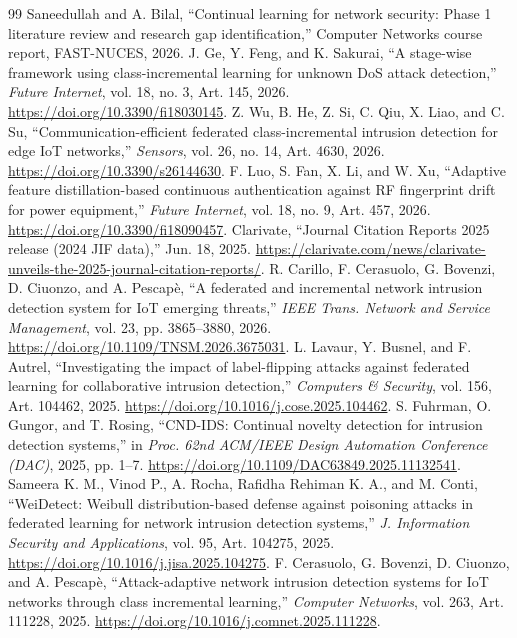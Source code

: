 \documentclass[10pt,a4paper]{article}
\begin{document}
\begin{thebibliography}{99}
 Saneedullah and A. Bilal, \enquote{Continual learning for network security: Phase 1 literature review and research gap identification,} Computer Networks course report, FAST-NUCES, 2026.
 J. Ge, Y. Feng, and K. Sakurai, \enquote{A stage-wise framework using class-incremental learning for unknown DoS attack detection,} \emph{Future Internet}, vol. 18, no. 3, Art. 145, 2026. \url{https://doi.org/10.3390/fi18030145}.
 Z. Wu, B. He, Z. Si, C. Qiu, X. Liao, and C. Su, \enquote{Communication-efficient federated class-incremental intrusion detection for edge IoT networks,} \emph{Sensors}, vol. 26, no. 14, Art. 4630, 2026. \url{https://doi.org/10.3390/s26144630}.
 F. Luo, S. Fan, X. Li, and W. Xu, \enquote{Adaptive feature distillation-based continuous authentication against RF fingerprint drift for power equipment,} \emph{Future Internet}, vol. 18, no. 9, Art. 457, 2026. \url{https://doi.org/10.3390/fi18090457}.
 Clarivate, \enquote{Journal Citation Reports 2025 release (2024 JIF data),} Jun. 18, 2025. \url{https://clarivate.com/news/clarivate-unveils-the-2025-journal-citation-reports/}.
 R. Carillo, F. Cerasuolo, G. Bovenzi, D. Ciuonzo, and A. Pescapè, \enquote{A federated and incremental network intrusion detection system for IoT emerging threats,} \emph{IEEE Trans. Network and Service Management}, vol. 23, pp. 3865--3880, 2026. \url{https://doi.org/10.1109/TNSM.2026.3675031}.
 L. Lavaur, Y. Busnel, and F. Autrel, \enquote{Investigating the impact of label-flipping attacks against federated learning for collaborative intrusion detection,} \emph{Computers \& Security}, vol. 156, Art. 104462, 2025. \url{https://doi.org/10.1016/j.cose.2025.104462}.
 S. Fuhrman, O. Gungor, and T. Rosing, \enquote{CND-IDS: Continual novelty detection for intrusion detection systems,} in \emph{Proc. 62nd ACM/IEEE Design Automation Conference (DAC)}, 2025, pp. 1--7. \url{https://doi.org/10.1109/DAC63849.2025.11132541}.
 Sameera K. M., Vinod P., A. Rocha, Rafidha Rehiman K. A., and M. Conti, \enquote{WeiDetect: Weibull distribution-based defense against poisoning attacks in federated learning for network intrusion detection systems,} \emph{J. Information Security and Applications}, vol. 95, Art. 104275, 2025. \url{https://doi.org/10.1016/j.jisa.2025.104275}.
 F. Cerasuolo, G. Bovenzi, D. Ciuonzo, and A. Pescapè, \enquote{Attack-adaptive network intrusion detection systems for IoT networks through class incremental learning,} \emph{Computer Networks}, vol. 263, Art. 111228, 2025. \url{https://doi.org/10.1016/j.comnet.2025.111228}.

\end{thebibliography}
\end{document}
